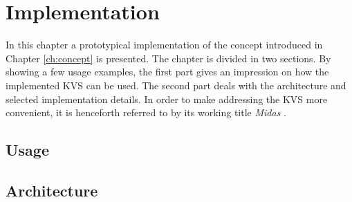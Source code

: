 \chapter{Implementation}
\label{ch:impl}

In this chapter a prototypical implementation of the concept introduced in
Chapter \ref{ch:concept} is presented. The chapter is divided in two sections.
By showing a few usage examples, the first part gives an impression on how the
implemented KVS can be used. The second part deals with the architecture and
selected implementation details. In order to make addressing the KVS more
convenient, it is henceforth referred to by its working title \emph{Midas}
\footnotemark.


\section{Usage}
\label{ch:impl-usage}


\section{Architecture}
\label{ch:impl-arch}


